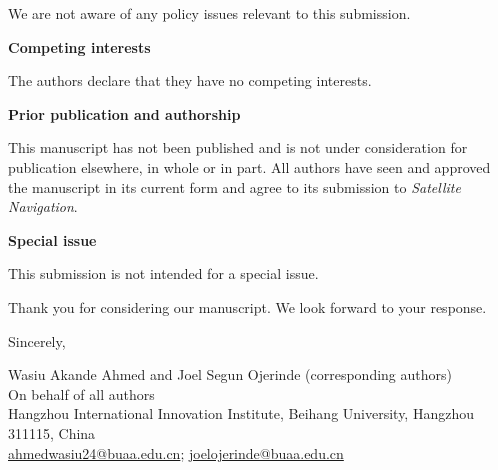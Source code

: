 \documentclass[11pt]{article}
\begin{document}
\vspace{0.5em}

\noindent We are not aware of any policy issues relevant to this submission.

\vspace{1em}
\noindent\textbf{Competing interests}

\vspace{0.5em}

\noindent The authors declare that they have no competing interests.

\vspace{1em}
\noindent\textbf{Prior publication and authorship}

\vspace{0.5em}

\noindent This manuscript has not been published and is not under consideration for
publication elsewhere, in whole or in part. All authors have seen and approved the
manuscript in its current form and agree to its submission to \emph{Satellite Navigation}.

\vspace{1em}
\noindent\textbf{Special issue}

\vspace{0.5em}

\noindent This submission is not intended for a special issue.

\vspace{1em}

\noindent Thank you for considering our manuscript. We look forward to your response.

\vspace{1.5em}

\noindent Sincerely,

\vspace{1em}

\noindent Wasiu Akande Ahmed and Joel Segun Ojerinde (corresponding authors) \\
On behalf of all authors \\
Hangzhou International Innovation Institute, Beihang University,
Hangzhou 311115, China \\
\href{mailto:ahmedwasiu24@buaa.edu.cn}{ahmedwasiu24@buaa.edu.cn};
\href{mailto:joelojerinde@buaa.edu.cn}{joelojerinde@buaa.edu.cn}
\end{document}
